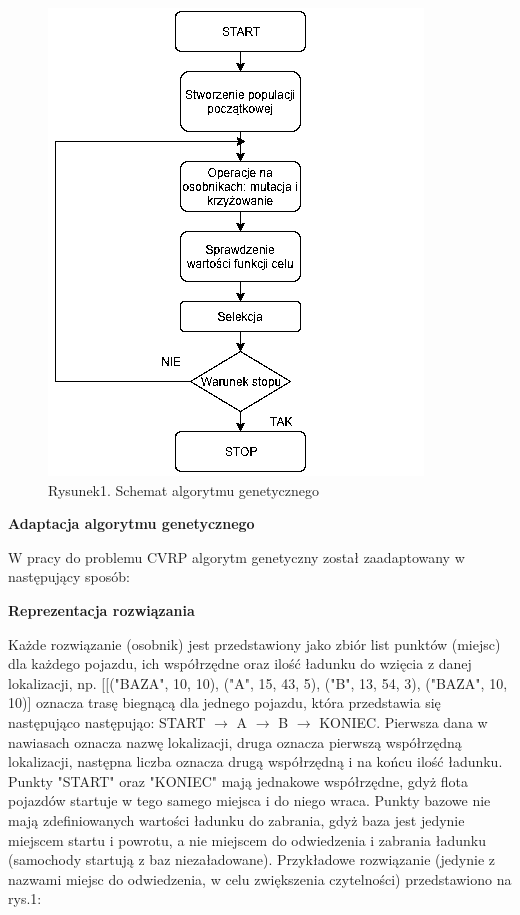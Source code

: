 \documentclass[a4paper, twoside, 12pt, justified]{article}
\begin{document}
	\begin{figure}[h]
		\includegraphics[scale=0.8]{ag}
		\centering
		\\
		{Rysunek1. Schemat algorytmu genetycznego} 
	\end{figure}	
	
	
	
	\begin{large}
		\begin{center}
			\textbf{Adaptacja algorytmu genetycznego}
		\end{center}
	\end{large}
	
	W pracy do problemu CVRP algorytm genetyczny został zaadaptowany w następujący sposób:
	
	\begin{center}
		\textbf{Reprezentacja rozwiązania}
	\end{center} 
	
	Każde rozwiązanie (osobnik) jest przedstawiony jako zbiór list punktów (miejsc) dla każdego pojazdu, ich współrzędne oraz ilość ładunku do wzięcia z danej lokalizacji, np. [[("BAZA", 10, 10), ("A", 15, 43, 5), ("B", 13, 54, 3), ("BAZA", 10, 10)] oznacza trasę biegnącą dla jednego pojazdu, która przedstawia się następująco następująo: START $\rightarrow$ A $\rightarrow$ B $\rightarrow$ KONIEC. Pierwsza dana w nawiasach oznacza nazwę lokalizacji, druga oznacza pierwszą współrzędną lokalizacji, następna liczba oznacza drugą współrzędną i na końcu ilość ładunku. Punkty "START" oraz "KONIEC" mają jednakowe współrzędne, gdyż flota pojazdów startuje w tego samego miejsca i do niego wraca. Punkty bazowe nie mają zdefiniowanych wartości ładunku do zabrania, gdyż baza jest jedynie miejscem startu i powrotu, a nie miejscem do odwiedzenia i zabrania ładunku (samochody startują z baz niezaładowane). Przykładowe rozwiązanie (jedynie z nazwami miejsc do odwiedzenia, w celu zwiększenia czytelności) przedstawiono na rys.1:
	
\end{document}
